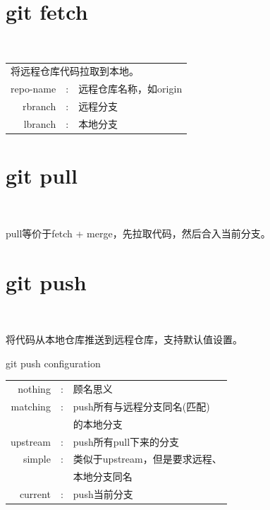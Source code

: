 ﻿\documentclass{beamer}
\begin{document}
\section[git fetch]{git fetch}
\begin{frame}{\ {}}
\begin{center}
{\small\ttfamily
  \begin{tabular}{rcl}
    \multicolumn{3}{l}{将远程仓库代码拉取到本地。} \\[10pt]
    repo-name & : & 远程仓库名称，如origin \\
    rbranch   & : & 远程分支 \\
    lbranch   & : & 本地分支 \\
  \end{tabular}
}
\end{center}
\end{frame}


\section[git pull]{git pull}
\begin{frame}{\ {}}
\begin{center}
  \begin{minipage}{0.7\textwidth}
    \ttfamily
    pull等价于fetch + merge，先拉取代码，然后合入当前分支。
  \end{minipage}
\end{center}
\end{frame}


\section[git push]{git push}
\begin{frame}{\ {}}
\centerline{将代码从本地仓库推送到远程仓库，支持默认值设置。}
\end{frame}

\begin{frame}{git push configuration}
\begin{center}
{\small\ttfamily
  \begin{tabular}{rcl}
    nothing & : & 顾名思义\\
    matching& : & push所有与远程分支同名(匹配)\\
            &   & 的本地分支\\
    upstream& : & push所有pull下来的分支\\
    simple  & : & 类似于upstream，但是要求远程、\\
            &   & 本地分支同名\\
    current & : & push当前分支\\
  \end{tabular}
}
\end{center}
\end{frame}
\end{document}
